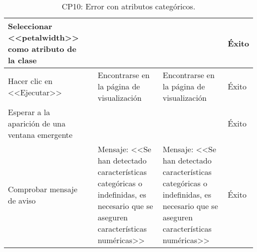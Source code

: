 \begin{center}
\begin{table}[H]
\begin{tabular}{p{}p{}p{}p{}p{}}
    Seleccionar <<petalwidth>> como atributo de la clase &                & & & Éxito \\ \hline
    Hacer clic en <<Ejecutar>>                            &                        & Encontrarse en la página de visualización                            & Encontrarse en la página de visualización                    & Éxito                            \\ \hline
    Esperar a la aparición de una ventana emergente&                   & & & Éxito  \\ \hline 
    Comprobar mensaje de aviso                            &                        & Mensaje: <<Se han detectado características categóricas o indefinidas, es necesario que se aseguren características numéricas>> & Mensaje: <<Se han detectado características categóricas o indefinidas, es necesario que se aseguren características numéricas>> & Éxito \\ \hline
    \end{tabular}
    \caption{CP10: Error con atributos categóricos.}
    \end{table}
    \end{center}
    
